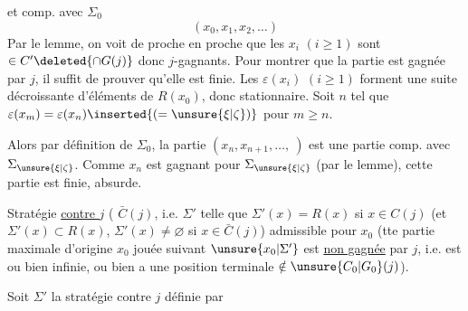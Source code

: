 et comp. avec $\Sigma_0$
\[
(x_0,x_1,x_2,\ldots)
\]
Par le lemme, on voit de proche en proche   que  les $x_i$ $(i\geq1)$ sont $\in C'\deleted{\cap G(j)}$ donc $j$-gagnants. Pour montrer que la partie est gagnée par $j$, il suffit de prouver qu'elle est finie.   Les $\varepsilon(x_i)$ $(i\geq1)$ forment une suite décroissante d'éléments de $R(x_0)$, donc stationnaire. Soit $n$ tel que $\varepsilon(x_m)=\varepsilon(x_n)\inserted{(=\unsure{\xi|\zeta})}$ pour $m\geq n$.

Alors par définition de $\Sigma_0$, la partie $(x_n,x_{n+1},\ldots,\ )$ est une partie comp. avec $\Sigma_{\unsure{\xi|\zeta}}$. Comme $x_n$ est gagnant pour $\Sigma_{\unsure{\xi|\zeta}}$ (par le lemme), cette partie est finie, absurde.

Stratégie \uline{contre $j$} ( $\bar C(j)$, i.e. $\Sigma'$ telle que $\Sigma'(x)=R(x)$ si $x\in C(j)$ (et $\Sigma'(x)\subset R(x)$, $\Sigma'(x)\ne\varnothing$ si $x\in\bar C(j)$) admissible pour $x_0$ (tte partie maximale d'origine $x_0$ jouée suivant $\unsure{x_0|\Sigma'}$ est \uline{non gagnée} par $j$, i.e. est ou bien infinie, ou bien a une position terminale $\notin\unsure{C_0|G_0}(j)$).

  Soit $\Sigma'$ la stratégie contre $j$ définie par
